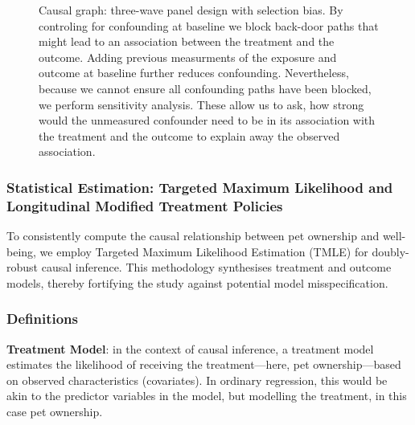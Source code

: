 \documentclass[
  singlecolumn,
  9pt]{article}
\begin{document}
\newpage{}

\begin{figure}


\caption{\label{fig-outcomewide-dag}Causal graph: three-wave panel
design with selection bias. By controling for confounding at baseline we
block back-door paths that might lead to an association between the
treatment and the outcome. Adding previous measurments of the exposure
and outcome at baseline further reduces confounding. Nevertheless,
because we cannot ensure all confounding paths have been blocked, we
perform sensitivity analysis. These allow us to ask, how strong would
the unmeasured confounder need to be in its association with the
treatment and the outcome to explain away the observed association.}

\end{figure}%

\newpage{}

\subsubsection{Statistical Estimation: Targeted Maximum Likelihood and
Longitudinal Modified Treatment
Policies}\label{statistical-estimation-targeted-maximum-likelihood-and-longitudinal-modified-treatment-policies}

To consistently compute the causal relationship between pet ownership
and well-being, we employ Targeted Maximum Likelihood Estimation (TMLE)
for doubly-robust causal inference. This methodology synthesises
treatment and outcome models, thereby fortifying the study against
potential model misspecification.

\subsubsection{Definitions}\label{definitions}

\textbf{Treatment Model}: in the context of causal inference, a
treatment model estimates the likelihood of receiving the
treatment---here, pet ownership---based on observed characteristics
(covariates). In ordinary regression, this would be akin to the
predictor variables in the model, but modelling the treatment, in this
case pet ownership.
\end{document}
